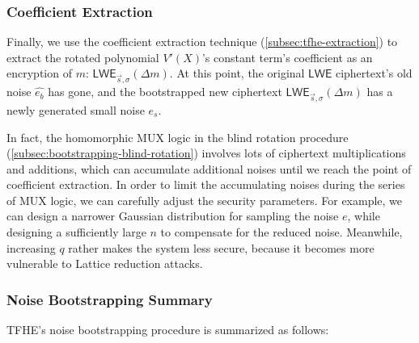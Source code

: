 \subsubsection{Coefficient Extraction}

Finally, we use the coefficient extraction technique (\autoref{subsec:tfhe-extraction}) to extract the rotated polynomial $V'(X)$'s constant term's coefficient as an encryption of $m$: $\textsf{LWE}_{\vec{s}, \sigma}(\Delta m)$. At this point, the original $\textsf{LWE}$ ciphertext's old noise $\hat{e_b}$ has gone, and the bootstrapped new ciphertext $\textsf{LWE}_{\vec{s}, \sigma}(\Delta m)$ has a newly generated small noise $e_s$. 

In fact, the homomorphic MUX logic in the blind rotation procedure (\autoref{subsec:bootstrapping-blind-rotation}) involves lots of ciphertext multiplications and additions, which can accumulate additional noises until we reach the point of coefficient extraction. In order to limit the accumulating noises during the series of MUX logic, we can carefully adjust the security parameters. For example, we can design a narrower Gaussian distribution for sampling the noise $e$, while designing a sufficiently large $n$ to compensate for the reduced noise. Meanwhile, increasing $q$ rather makes the system less secure, because it becomes more vulnerable to Lattice reduction attacks. 






\subsubsection{Noise Bootstrapping Summary}
\label{subsec:tfhe-summary}

TFHE's noise bootstrapping procedure is summarized as follows:

